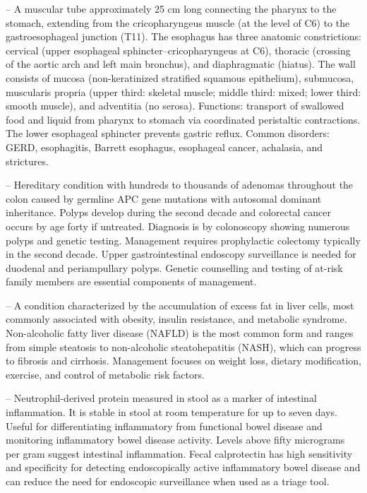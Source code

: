 -- A muscular tube approximately 25 cm long connecting the pharynx to the stomach, extending from the cricopharyngeus muscle (at the level of C6) to the gastroesophageal junction (T11). The esophagus has three anatomic constrictions: cervical (upper esophageal sphincter--cricopharyngeus at C6), thoracic (crossing of the aortic arch and left main bronchus), and diaphragmatic (hiatus). The wall consists of mucosa (non-keratinized stratified squamous epithelium), submucosa, muscularis propria (upper third: skeletal muscle; middle third: mixed; lower third: smooth muscle), and adventitia (no serosa). Functions: transport of swallowed food and liquid from pharynx to stomach via coordinated peristaltic contractions. The lower esophageal sphincter prevents gastric reflux. Common disorders: GERD, esophagitis, Barrett esophagus, esophageal cancer, achalasia, and strictures.

-- Hereditary condition with hundreds to thousands of adenomas throughout the colon caused by germline APC gene mutations with autosomal dominant inheritance. Polyps develop during the second decade and colorectal cancer occurs by age forty if untreated. Diagnosis is by colonoscopy showing numerous polyps and genetic testing. Management requires prophylactic colectomy typically in the second decade. Upper gastrointestinal endoscopy surveillance is needed for duodenal and periampullary polyps. Genetic counselling and testing of at-risk family members are essential components of management.

-- A condition characterized by the accumulation of excess fat in liver cells, most commonly associated with obesity, insulin resistance, and metabolic syndrome. Non-alcoholic fatty liver disease (NAFLD) is the most common form and ranges from simple steatosis to non-alcoholic steatohepatitis (NASH), which can progress to fibrosis and cirrhosis. Management focuses on weight loss, dietary modification, exercise, and control of metabolic risk factors.

-- Neutrophil-derived protein measured in stool as a marker of intestinal inflammation. It is stable in stool at room temperature for up to seven days. Useful for differentiating inflammatory from functional bowel disease and monitoring inflammatory bowel disease activity. Levels above fifty micrograms per gram suggest intestinal inflammation. Fecal calprotectin has high sensitivity and specificity for detecting endoscopically active inflammatory bowel disease and can reduce the need for endoscopic surveillance when used as a triage tool.


